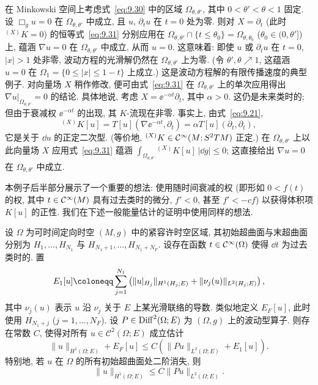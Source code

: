 \begin{example}[有限传播速度]\label{eg:9.18}
在 Minkowski 空间上考虑式~\eqref{eq:9.30} 中的区域 $\Omega_{\theta, \theta'}$, 其中 $0 < \theta' < \theta < 1$ 固定. 设 $\Box_g u = 0$ 在 $\Omega_{\theta, \theta'}$ 中成立, 且 $u$, $\partial_t u$ 在 $t = 0$ 处为零. 则对 $X = \partial_t$ (此时 ${}^{(X)} K = 0$) 的恒等式~\eqref{eq:9.31} 分别应用在 $\Omega_{\theta, \theta'} \cap \{t \le \theta_0\} = \Omega_{\theta, \theta_0}$ ($\theta_0 \in (0, \theta']$) 上, 蕴涵 $\nabla u = 0$ 在 $\Omega_{\theta, \theta'}$ 中成立, 从而 $u = 0$. 这意味着: 即使 $u$ 或 $\partial_t u$ 在 $t = 0$, $|x| > 1$ 处非零, 波动方程的光滑解仍然在 $\Omega_{\theta, \theta'}$ 上为零. (令 $\theta', \theta \nearrow 1$, 这蕴涵 $u = 0$ 在 $\Omega_1 = \{0 \le |x| \le 1 - t\}$ 上成立.) 这是波动方程解的有限传播速度的典型例子. 对向量场 $X$ 稍作修改, 便可由式~\eqref{eq:9.31} 在 $\Omega_{\theta, \theta'}$ 上的单次应用得出 $\nabla u|_{\Omega_{\theta, \theta'}} = 0$ 的结论. 具体地说, 考虑 $X = \ee^{-\alpha t} \partial_t$, 其中 $\alpha > 0$. 这仍是未来类时的; 但由于衰减权 $\ee^{-\alpha t}$ 的出现, 其 $K$-流现在非零. 事实上, 由式~\eqref{eq:9.21},
\begin{equation}\label{eq:9.40}
    {}^{(X)} K[u] = T[u](\nabla \ee^{-\alpha t}, \partial_t) = \alpha T[u](\partial_t, \partial_t),
\end{equation}
它是关于 $\dd u$ 的正定二次型. (等价地, ${}^{(X)} K \in \mathcal{C}^\infty(M; S^2 T M)$ 正定.) 在 $\Omega_{\theta, \theta'}$ 上以此向量场 $X$ 应用式~\eqref{eq:9.31} 蕴涵 $\int_{\Omega_{\theta, \theta'}} {}^{(X)} K[u] \, |\dd g| \le 0$; 这直接给出 $\nabla u = 0$ 在 $\Omega_{\theta, \theta'}$ 中成立.

本例子后半部分展示了一个重要的想法: 使用随时间衰减的权 (即形如 $0 < f(t)$ 的权, 其中 $t \in \mathcal{C}^\infty(M)$ 具有过去类时的微分, $f' < 0$, 甚至 $f' < -cf$) 以获得体积项 $K[u]$ 的正性. 我们在下述一般能量估计的证明中使用同样的想法.
\end{example}

\begin{theorem}[能量估计]\label{thm:9.19}
设 $\Omega$ 为可时间定向时空 $(M, g)$ 中的紧容许时空区域, 其初始超曲面与末超曲面分别为 $H_1, \ldots, H_{N_1}$ 与 $H_{N_1+1}, \ldots, H_{N_1+N_F}$. 设存在函数 $t \in \mathcal{C}^\infty(\Omega)$ 使得 $\dd t$ 为过去类时的. 置
\begin{equation}\label{eq:9.41}
    E_1[u] \defeq \sum_{j=1}^{N_1} \left( \|u|_{H_j}\|_{H^1(H_j; E)} + \|\nu_j(u)\|_{L^2(H_j; E)} \right),
\end{equation}
其中 $\nu_j(u)$ 表示 $u$ 沿 $\nu_j$ 关于 $E$ 上某光滑联络的导数. 类似地定义 $E_F[u]$, 此时使用 $H_{N_1+j}$ ($j = 1, \ldots, N_F$). 设 $P \in \operatorname{Diff}^2(\Omega; E)$ 为 $(\Omega, g)$ 上的波动型算子. 则存在常数 $C$, 使得对所有 $u \in \mathcal{C}^2(\Omega; E)$ 成立估计
\begin{equation}\label{eq:9.42}
    \|u\|_{H^1(\Omega; E)} + E_F[u] \le C \left( \|P u\|_{L^2(\Omega; E)} + E_1[u] \right).
\end{equation}
特别地, 若 $u$ 在 $\Omega$ 的所有初始超曲面处二阶消失, 则
\begin{equation}\label{eq:9.43}
    \|u\|_{H^1(\Omega; E)} \le C \|P u\|_{L^2(\Omega; E)}.
\end{equation}
\end{theorem}


